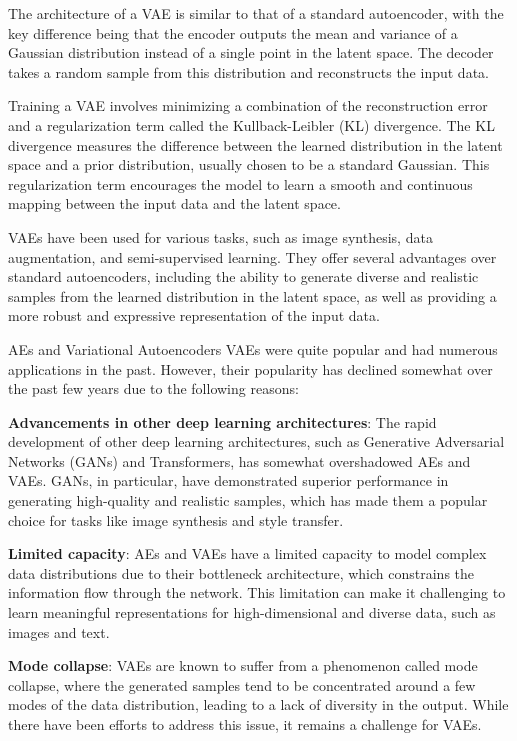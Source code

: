 \documentclass[12pt]{article}
\begin{document}
The architecture of a VAE is similar to that of a standard autoencoder, with the key difference being that the encoder outputs the mean and variance of a Gaussian distribution instead of a single point in the latent space. The decoder takes a random sample from this distribution and reconstructs the input data.

Training a VAE involves minimizing a combination of the reconstruction error and a regularization term called the Kullback-Leibler (KL) divergence. The KL divergence measures the difference between the learned distribution in the latent space and a prior distribution, usually chosen to be a standard Gaussian. This regularization term encourages the model to learn a smooth and continuous mapping between the input data and the latent space.

VAEs have been used for various tasks, such as image synthesis, data augmentation, and semi-supervised learning. They offer several advantages over standard autoencoders, including the ability to generate diverse and realistic samples from the learned distribution in the latent space, as well as providing a more robust and expressive representation of the input data.

AEs and Variational Autoencoders VAEs were quite popular and had numerous applications in the past. However, their popularity has declined somewhat over the past few years due to the following reasons:

\textbf{Advancements in other deep learning architectures}: The rapid development of other deep learning architectures, such as Generative Adversarial Networks (GANs) and Transformers, has somewhat overshadowed AEs and VAEs. GANs, in particular, have demonstrated superior performance in generating high-quality and realistic samples, which has made them a popular choice for tasks like image synthesis and style transfer.

\textbf{Limited capacity}: AEs and VAEs have a limited capacity to model complex data distributions due to their bottleneck architecture, which constrains the information flow through the network. This limitation can make it challenging to learn meaningful representations for high-dimensional and diverse data, such as images and text.

\textbf{Mode collapse}: VAEs are known to suffer from a phenomenon called mode collapse, where the generated samples tend to be concentrated around a few modes of the data distribution, leading to a lack of diversity in the output. While there have been efforts to address this issue, it remains a challenge for VAEs.
\end{document}
